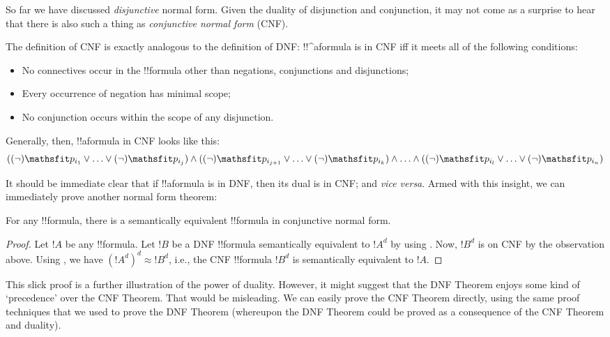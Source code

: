\documentclass[../../../include/open-logic-section]{subfiles}
\begin{document}
So far we have discussed \emph{disjunctive} normal form. Given the duality of disjunction and conjunction, it may not come as a surprise to hear that there is also such a thing as \emph{conjunctive normal form} (CNF).

The definition of CNF is exactly analogous to the definition of DNF: !!^a{formula} is in CNF iff it meets all of the following conditions:
	\begin{itemize}
		\item No connectives occur in the !!{formula} other than negations, conjunctions and disjunctions;
		\item Every occurrence of negation has minimal scope;
		\item No conjunction occurs within the scope of any disjunction. 
	\end{itemize}
Generally, then, !!a{formula} in CNF looks like this:
$$((\lnot) {\Obj p_{i_1}} \lor \ldots \lor (\lnot) {\Obj p_{i_j}}) \land ((\lnot) {\Obj p_{i_{j+1}}} \lor \ldots \lor (\lnot){\Obj p_{i_k}}) \land \ldots \land ((\lnot){\Obj p_{i_{l}}} \lor \ldots \lor (\lnot) {\Obj p_{i_n}})$$

It should be immediate clear that if !!a{formula} is in DNF, then its dual is in CNF; and \emph{vice versa}. Armed with this insight, we can immediately prove another normal form theorem:
	\begin{prop} For any !!{formula}, there is a semantically equivalent !!{formula} in conjunctive normal form.
	\end{prop}
\begin{proof}
	Let $!A$ be any !!{formula}. Let $!B$ be a DNF !!{formula} semantically equivalent to $!A^d$ by using . Now, $!B^d$ is on CNF by the observation above. Using , we have $(!A^d)^d \approx !B^d$, i.e., the CNF !!{formula} $!B^d$ is semantically equivalent to $!A$.
\end{proof}

This slick proof is a further illustration of the power of duality. However, it might suggest that the DNF Theorem enjoys some kind of `precedence' over the CNF Theorem. That would be misleading.  We can easily prove the CNF Theorem directly, using the same proof techniques that we used to prove the DNF Theorem (whereupon the DNF Theorem could be proved as a consequence of the CNF Theorem and duality). 
\end{document}
